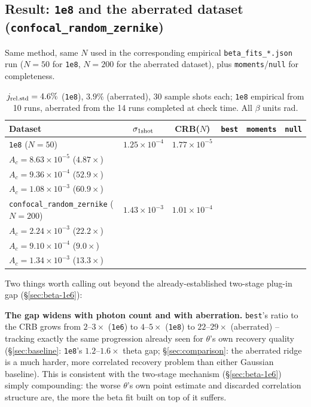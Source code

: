 \documentclass[11pt,a4paper]{article}
\newcommand{\code}[1]{\texttt{#1}}
\begin{document}
\subsection{Result: \code{1e8} and the aberrated dataset (\code{confocal\_random\_zernike})}
\label{sec:beta-1e8-aberrated}

Same method, same $N$ used in the corresponding empirical
\code{beta\_fits\_*.json} run ($N{=}50$ for \code{1e8}, $N{=}200$ for the
aberrated dataset), plus \code{moments}/\code{null} for completeness.

\begin{table}[h]
\centering\small
\begin{tabular}{lccccc}
\toprule
Dataset & $\sigma_{\rm 1shot}$ & CRB($N$) & \code{best} & \code{moments} & \code{null} \\
\midrule
\code{1e8} ($N{=}50$)
  & $1.25\times10^{-4}$ & $1.77\times10^{-5}$
  & \makecell[l]{$A_s{=}7.40\times10^{-5}$ ($4.18\times$)\\$A_c{=}8.63\times10^{-5}$ ($4.87\times$)}
  & \makecell[l]{$A_s{=}5.66\times10^{-4}$ ($32.0\times$)\\$A_c{=}9.36\times10^{-4}$ ($52.9\times$)}
  & \makecell[l]{$A_s{=}6.41\times10^{-4}$ ($36.2\times$)\\$A_c{=}1.08\times10^{-3}$ ($60.9\times$)} \\
\midrule
\code{confocal\_random\_zernike} ($N{=}200$)
  & $1.43\times10^{-3}$ & $1.01\times10^{-4}$
  & \makecell[l]{$A_s{=}2.92\times10^{-3}$ ($28.9\times$)\\$A_c{=}2.24\times10^{-3}$ ($22.2\times$)}
  & \makecell[l]{$A_s{=}1.31\times10^{-3}$ ($12.9\times$)\\$A_c{=}9.10\times10^{-4}$ ($9.0\times$)}
  & \makecell[l]{$A_s{=}2.16\times10^{-3}$ ($21.4\times$)\\$A_c{=}1.34\times10^{-3}$ ($13.3\times$)} \\
\bottomrule
\end{tabular}
\caption{$j_{\rm rel.std}=4.6\%$ (\code{1e8}), $3.9\%$ (aberrated), 30 sample
shots each; \code{1e8} empirical from 10 runs, aberrated from the 14 runs
completed at check time. All $\beta$ units rad.}
\end{table}

Two things worth calling out beyond the already-established two-stage
plug-in gap (\S\ref{sec:beta-1e6}):

\textbf{The gap widens with photon count and with aberration.} \code{best}'s
ratio to the CRB grows from $2$--$3\times$ (\code{1e6}) to $4$--$5\times$
(\code{1e8}) to $22$--$29\times$ (aberrated) -- tracking exactly the same
progression already seen for $\theta$'s own recovery quality
(\S\ref{sec:baseline}: \code{1e8}'s $1.2$--$1.6\times$ theta gap;
\S\ref{sec:comparison}: the aberrated ridge is a much harder, more
correlated recovery problem than either Gaussian baseline). This is
consistent with the two-stage mechanism (\S\ref{sec:beta-1e6}) simply
compounding: the worse $\theta$'s own point estimate and discarded
correlation structure are, the more the beta fit built on top of it suffers.
\end{document}
